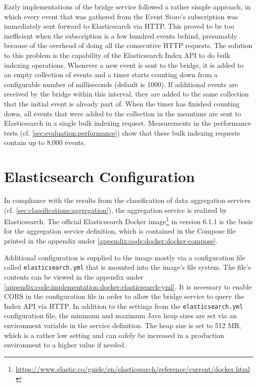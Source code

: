 Early implementations of the bridge service followed a rather simple approach, in which every event that was gathered from the Event Store's subscription was immediately sent forward to Elasticsearch via \ac{HTTP}.
This proved to be too inefficient when the subscription is a few hundred events behind, presumably because of the overhead of doing all the consecutive \ac{HTTP} requests.
The solution to this problem is the capability of the Elasticsearch Index \ac{API} to do bulk indexing operations.
Whenever a new event is sent to the bridge, it is added to an empty collection of events and a timer starts counting down from a configurable number of milliseconds (default is 1000).
If additional events are received by the bridge within this interval, they are added to the same collection that the initial event is already part of.
When the timer has finished counting down, all events that were added to the collection in the meantime are sent to Elasticsearch in a single bulk indexing request.
Measurements in the performance tests (cf. \cref{sec:evaluation:performance}) show that these bulk indexing requests contain up to 8,000 events.

\section{Elasticsearch Configuration}
\label{sec:implementation:aggregation}

In compliance with the results from the classification of data aggregation services (cf. \cref{sec:classifications:aggregation}), the aggregation service is realized by Elasticsearch.
The official Elasticsearch Docker image\footnote{\url{https://www.elastic.co/guide/en/elasticsearch/reference/current/docker.html}} in version 6.1.1 is the basis for the aggregation service definition, which is contained in the Compose file printed in the appendix under \cref{appendix:code:docker:docker-compose}.

Additional configuration is supplied to the image mostly via a configuration file called \texttt{elasticsearch.yml} that is mounted into the image's file system.
The file's contents can be viewed in the appendix under \cref{appendix:code:implementation:docker:elasticsearch-yml}.
It is necessary to enable \ac{CORS} in the configuration file in order to allow the bridge service to query the Index \ac{API} via \ac{HTTP}.
In addition to the settings from the \texttt{elasticsearch.yml} configuration file, the minimum and maximum Java heap sizes are set via an environment variable in the service definition.
The heap size is set to 512 MB, which is a rather low setting and can safely be increased in a production environment to a higher value if needed.

